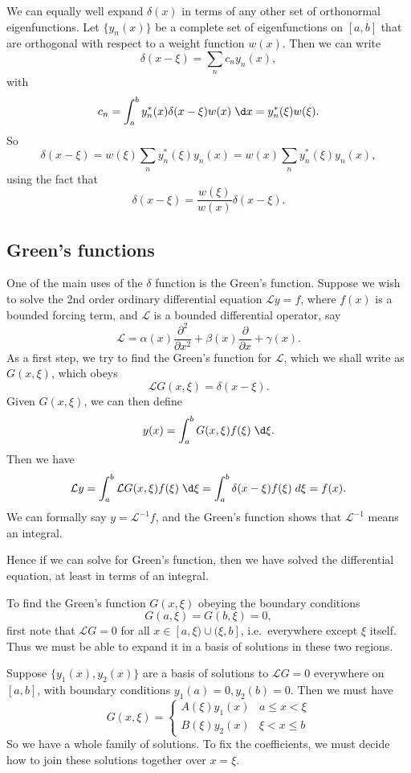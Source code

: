 \documentclass[a4paper]{article}
\begin{document}
We can equally well expand $\delta(x)$ in terms of any other set of orthonormal eigenfunctions. Let $\{y_n(x)\}$ be a complete set of eigenfunctions on $[a, b]$ that are orthogonal with respect to a weight function $w(x)$. Then we can write
\[
  \delta (x - \xi) = \sum_{n} c_n y_n(x),
\]
with
\[
  c_n = \int_a^b y_n^*(x) \delta(x - \xi) w(x)\;\d x = y_n^*(\xi) w(\xi).
\]
So
\[
  \delta(x - \xi) = w(\xi) \sum_n y_n^* (\xi) y_n(x) = w(x) \sum_n y_n^*(\xi) y_n(x),
\]
using the fact that
\[
  \delta(x - \xi) = \frac{w(\xi)}{w(x)} \delta(x - \xi).
\]
\subsection{Green's functions}
One of the main uses of the $\delta$ function is the Green's function. Suppose we wish to solve the 2nd order ordinary differential equation $\mathcal{L}y = f$, where $f(x)$ is a bounded forcing term, and $\mathcal{L}$ is a bounded differential operator, say
\[
  \mathcal{L} = \alpha(x) \frac{\partial^2}{\partial x^2} + \beta(x) \frac{\partial}{\partial x} + \gamma(x).
\]
As a first step, we try to find the Green's function for $\mathcal{L}$, which we shall write as $G(x, \xi)$, which obeys
\[
  \mathcal{L} G(x, \xi) = \delta(x - \xi).
\]
Given $G(x, \xi)$, we can then define
\[
  y(x) = \int_{a}^b G(x, \xi) f(\xi) \;\d \xi.
\]
Then we have
\[
  \mathcal{L}y = \int_a^b \mathcal{L} G(x, \xi) f(\xi)\;\d \xi = \int_a^b \delta(x - \xi) f(\xi) \;d\xi = f(x).
\]
We can formally say $y = \mathcal{L}^{-1} f$, and the Green's function shows that $\mathcal{L}^{-1}$ means an integral.

Hence if we can solve for Green's function, then we have solved the differential equation, at least in terms of an integral.

To find the Green's function $G(x, \xi)$ obeying the boundary conditions
\[
  G(a, \xi) = G(b, \xi) = 0,
\]
first note that $\mathcal{L} G = 0$ for all $x \in [a, \xi) \cup (\xi, b]$, i.e.\ everywhere except $\xi$ itself. Thus we must be able to expand it in a basis of solutions in these two regions.

Suppose $\{y_1(x), y_2(x)\}$ are a basis of solutions to $\mathcal{L}G = 0$ everywhere on $[a, b]$, with boundary conditions $y_1(a) = 0, y_2(b) = 0$. Then we must have
\[
  G(x, \xi) =
  \begin{cases}
    A(\xi) y_1(x) & a \leq x < \xi\\
    B(\xi) y_2(x) & \xi < x \leq b
  \end{cases}
\]
So we have a whole family of solutions. To fix the coefficients, we must decide how to join these solutions together over $x = \xi$.
\end{document}
